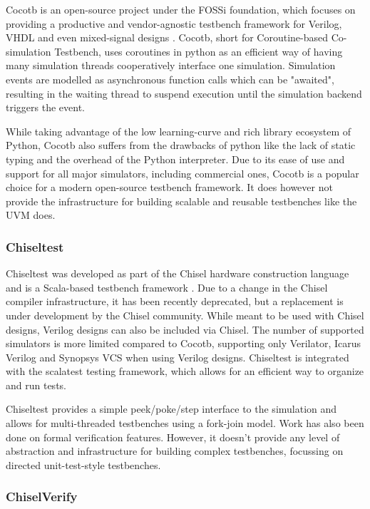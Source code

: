 \documentclass[11pt]{report}
\begin{document}
Cocotb is an open-source project under the FOSSi foundation, which focuses on providing a productive and
vendor-agnostic testbench framework for Verilog, VHDL and even mixed-signal designs \cite{cocotb}. Cocotb, short for
Coroutine-based Co-simulation Testbench, uses coroutines in python as an efficient way of having many simulation
threads cooperatively interface one simulation. Simulation events are modelled as asynchronous function calls which
can be "awaited", resulting in the waiting thread to suspend execution until the simulation backend triggers the event.

While taking advantage of the low learning-curve and rich library ecosystem of Python, Cocotb also suffers from the
drawbacks of python like the lack of static typing and the overhead of the Python interpreter. Due to its ease of use
and support for all major simulators, including commercial ones, Cocotb is a popular choice for a modern open-source
testbench framework. It does however not provide the infrastructure for building scalable and reusable testbenches
like the UVM does.

\subsubsection{Chiseltest} %

Chiseltest was developed as part of the Chisel hardware construction language and is a Scala-based testbench
framework \cite{chiseltest}. Due to a change in the Chisel compiler infrastructure, it has been recently deprecated,
but a replacement is under development by the Chisel community. While meant to be used with Chisel designs, Verilog
designs can also be included via Chisel. The number of supported simulators is more limited compared to Cocotb,
supporting only Verilator, Icarus Verilog and Synopsys VCS when using Verilog designs. Chiseltest is integrated with
the scalatest testing framework, which allows for an efficient way to organize and run tests.

Chiseltest provides a simple peek/poke/step interface to the simulation and allows for multi-threaded testbenches
using a fork-join model. Work has also been done on formal verification features. However, it doesn't provide any
level of abstraction and infrastructure for building complex
testbenches, focussing on directed unit-test-style testbenches.

\subsubsection{ChiselVerify} %
\end{document}
